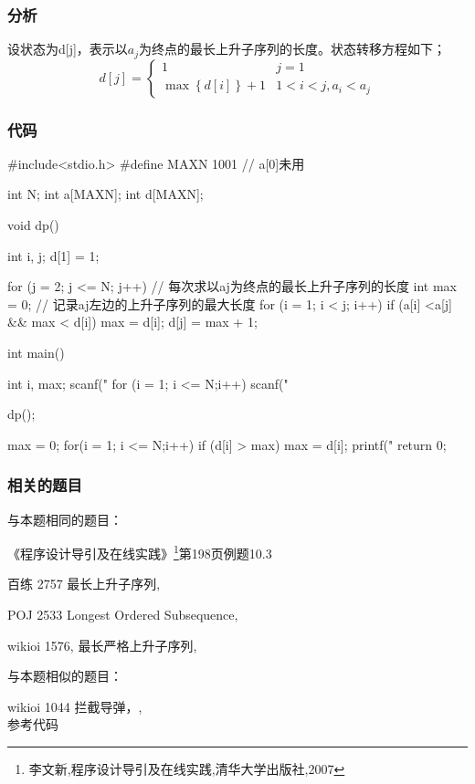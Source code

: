 \subsubsection{分析}
设状态为d[j]，表示以$a_j$为终点的最长上升子序列的长度。状态转移方程如下；
$$
d[j]=\begin{cases}
1 & j=1\\
\max\left\{d[i]\right\}+1 & 1<i<j,a_i<a_j
\end{cases}
$$

\subsubsection{代码}

\begin{Codex}[label=lis.c]
#include<stdio.h>
#define MAXN 1001 // a[0]未用

int N;
int a[MAXN];
int d[MAXN];

void dp() {
    int i, j;
    d[1] = 1;
 
    for (j = 2; j <= N; j++) { // 每次求以aj为终点的最长上升子序列的长度
        int max = 0;  // 记录aj左边的上升子序列的最大长度 
        for (i = 1; i < j; i++)  if (a[i] <a[j] && max < d[i]) max = d[i];
        d[j] = max + 1;
    }
}

int main() {
    int i, max;
    scanf("%
    for (i = 1; i <= N;i++) scanf("%
    
    dp();

    max = 0;
    for(i = 1; i <= N;i++) if (d[i] > max) max = d[i];
    printf("%
    return 0;
}
\end{Codex}

\subsubsection{相关的题目}
与本题相同的题目：
\begindot
\item 《程序设计导引及在线实践》\footnote{李文新,程序设计导引及在线实践,清华大学出版社,2007}第198页例题10.3
\item 百练 2757 最长上升子序列, 
\item POJ 2533 Longest Ordered Subsequence, 
\item wikioi 1576, 最长严格上升子序列, 
\myenddot

与本题相似的题目：
\begindot
\item  wikioi 1044 拦截导弹，, \\
参考代码 
\myenddot


